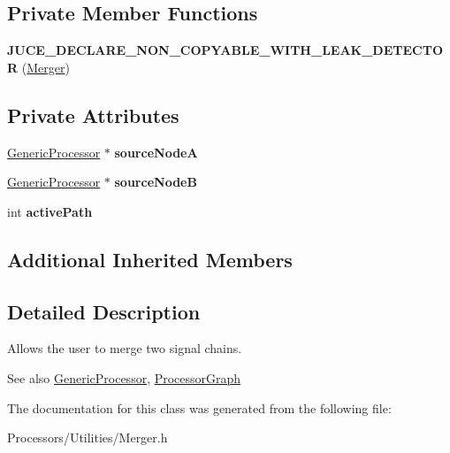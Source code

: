 \subsection*{Private Member Functions}
\begin{DoxyCompactItemize}
\item 
\hypertarget{classMerger_aa47068bd4f085cf9f4a763004ba8d19d}{{\bfseries J\-U\-C\-E\-\_\-\-D\-E\-C\-L\-A\-R\-E\-\_\-\-N\-O\-N\-\_\-\-C\-O\-P\-Y\-A\-B\-L\-E\-\_\-\-W\-I\-T\-H\-\_\-\-L\-E\-A\-K\-\_\-\-D\-E\-T\-E\-C\-T\-O\-R} (\hyperlink{classMerger}{Merger})}\label{classMerger_aa47068bd4f085cf9f4a763004ba8d19d}

\end{DoxyCompactItemize}
\subsection*{Private Attributes}
\begin{DoxyCompactItemize}
\item 
\hypertarget{classMerger_af44bcada79c68b218545ba4faa41018a}{\hyperlink{classGenericProcessor}{Generic\-Processor} $\ast$ {\bfseries source\-Node\-A}}\label{classMerger_af44bcada79c68b218545ba4faa41018a}

\item 
\hypertarget{classMerger_a6abc16576ec9bb2c0766c0683ac68fbb}{\hyperlink{classGenericProcessor}{Generic\-Processor} $\ast$ {\bfseries source\-Node\-B}}\label{classMerger_a6abc16576ec9bb2c0766c0683ac68fbb}

\item 
\hypertarget{classMerger_a9a04d3143417e5df11d2db947bd512e8}{int {\bfseries active\-Path}}\label{classMerger_a9a04d3143417e5df11d2db947bd512e8}

\end{DoxyCompactItemize}
\subsection*{Additional Inherited Members}


\subsection{Detailed Description}
Allows the user to merge two signal chains.

\begin{DoxySeeAlso}{See also}
\hyperlink{classGenericProcessor}{Generic\-Processor}, \hyperlink{classProcessorGraph}{Processor\-Graph} 
\end{DoxySeeAlso}


The documentation for this class was generated from the following file\-:\begin{DoxyCompactItemize}
\item 
Processors/\-Utilities/Merger.\-h\end{DoxyCompactItemize}
